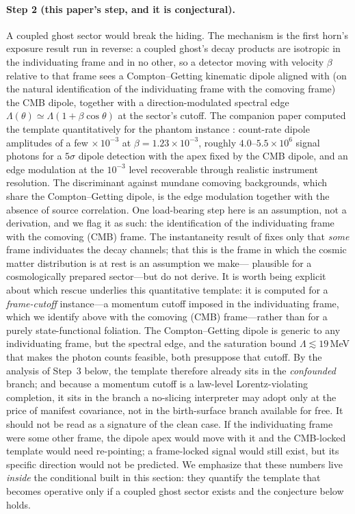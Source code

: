 \documentclass[11pt]{article}
\theoremstyle{remark}
\begin{document}
\paragraph{Step 2 (this paper's step, and it is conjectural).} A
coupled ghost sector would break the hiding. The mechanism is the
first horn's exposure result run in reverse: a coupled ghost's decay
products are isotropic in the individuating frame and in no other,
so a detector moving with velocity $\beta$ relative to that frame
sees a Compton--Getting kinematic dipole aligned with (on the
natural identification of the individuating frame with the comoving
frame) the CMB dipole, together with a direction-modulated spectral
edge $\Lambda(\theta)\simeq\Lambda(1+\beta\cos\theta)$ at the
sector's cutoff. The companion paper computed the template
quantitatively for the phantom instance \cite{instantaneous}:
count-rate dipole amplitudes of a few$\,\times10^{-3}$ at
$\beta=1.23\times10^{-3}$, roughly $4.0$--$5.5\times10^{6}$ signal
photons for a $5\sigma$ dipole detection with the apex fixed by the
CMB dipole, and an edge modulation at the $10^{-3}$ level recoverable
through realistic instrument resolution. The discriminant against
mundane comoving backgrounds, which share the Compton--Getting
dipole, is the edge modulation together with the absence of source
correlation. One load-bearing step here is an assumption, not a
derivation, and we flag it as such: the identification of the
individuating frame with the comoving (CMB) frame. The instantaneity
result of \cite{instantaneous} fixes only that \emph{some} frame
individuates the decay channels; that this is the frame in which the
cosmic matter distribution is at rest is an assumption we make---%
plausible for a cosmologically prepared sector---but do not derive.
It is worth being explicit about which rescue underlies this
quantitative template: it is computed for a \emph{frame-cutoff}
instance---a momentum cutoff imposed in the individuating frame, which
we identify above with the comoving (CMB) frame---rather than for a
purely state-functional foliation. The Compton--Getting dipole is
generic to any individuating frame, but the spectral edge, and the
saturation bound $\Lambda\lesssim19\,$MeV that makes the photon counts
feasible, both presuppose that cutoff. By the analysis of Step~3 below,
the template therefore already sits in the \emph{confounded} branch;
and because a momentum cutoff is a law-level Lorentz-violating
completion, it sits in the branch a no-slicing interpreter may adopt
only at the price of manifest covariance, not in the birth-surface
branch available for free. It should not be read as a signature of the
clean case. If
the individuating frame were some other frame, the dipole apex would
move with it and the CMB-locked template would need re-pointing; a
frame-locked signal would still exist, but its specific direction would
not be predicted. We emphasize that these numbers live \emph{inside}
the conditional built in this section: they quantify the template that
becomes operative only if a coupled ghost sector exists and the
conjecture below holds.
\end{document}
